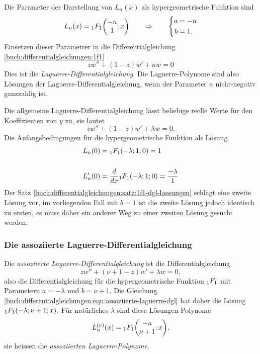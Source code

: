Die Parameter der Darstellung von $L_n(x)$ als hypergeometrische
Funktion sind
\[
L_n(x) = \mathstrut_1F_1\biggl(
\begin{matrix}-n\\1\end{matrix}
;x
\biggr)
\qquad\Rightarrow\qquad
\left\{
\begin{aligned}
a&=-n\\
b&=1.
\end{aligned}
\right.
\]
Einsetzen dieser Parametrer in die Differentialgleichung
\eqref{buch:differentialgleichungen:1f1}
\begin{equation}
zw'' + (1-z)w'+nw=0
\label{buch:differentialgleichungen:eqn:laguerre-dgl}
\end{equation}
Dies ist die {\em Laguerre-Differentialgleichung}.
%
%
Die Laguerre-Polynome sind also Lösungen der Laguerre-Differentialgleichung,
wenn der Parameter $n$ nicht-negativ ganzzahlig ist.

Die allgemeine Laguerre-Differentialgleichung lässt beliebige reelle
Werte für den Koeffizienten von $y$ zu, sie lautet
\[
zw''+(1-z)w'+\lambda w=0.
\]
Die Anfangsbedingungen für die hypergeometrische Funktion als Lösung 
\begin{align*}
L_n(0)  &= \mathstrut_1F_1(-\lambda; 1; 0) = 1\\
\\
L'_n(0) &=
\frac{d}{dx}
\mathstrut_1F_1(-\lambda;1;0) = \frac{-\lambda}{1}
\end{align*}
Der Satz
\ref{buch:differentialgleichungen:satz:1f1-dgl-loesungen}
schlägt eine zweite Lösung vor, im vorliegenden Fall mit $b=1$
ist die zweite Lösung jedoch identisch zu ersten, es muss daher
ein anderer Weg zu einer zweiten Lösung gesucht werden.


%
%
%
\subsubsection{Die assoziierte Laguerre-Differentialgleichung}
%
%
%
Die {\em assoziierte Laguerre-Differentialgleichung} ist die
Differentialgleichung
\begin{equation}
zw'' + (\nu  +1-z)w' + \lambda w = 0,
\label{buch:differentialgleichungen:eqn:assoziierte-laguerre-dgl}
\end{equation}
also die Differentialgleichung für die hypergeometrische Funktion
$\mathstrut_1F_1$ mit Parametern $a=-\lambda$ und $b=\nu+1$.
Die Gleichung
\eqref{buch:differentialgleichungen:eqn:assoziierte-laguerre-dgl}
hat daher die Lösung
\(
\mathstrut_1F_1(-\lambda;\nu+1;x).
\)
Für natürliches $\lambda$ sind diese Lösungen Polynome
\[
L_n^{(\nu)}(x)
=
\mathstrut_1F_1\biggl(
\begin{matrix}-n\\\nu+1\end{matrix}
;x\biggr),
\]
sie heissen die {\em assoziierten Laguerre-Polynome}.
%
%

